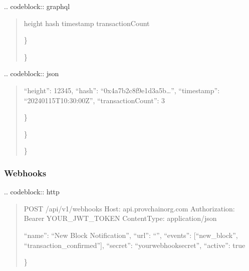 \documentclass[letterpaper,10pt,english]{sphinxmanual}
\begin{document}
\sphinxAtStartPar
{}
.. code\sphinxhyphen{}block:: graphql
\begin{quote}
\begin{description}
\begin{description}
\sphinxAtStartPar
height
hash
timestamp
transactionCount

\end{description}

\sphinxAtStartPar
\}

\end{description}

\sphinxAtStartPar
\}
\end{quote}

\sphinxAtStartPar
{}
.. code\sphinxhyphen{}block:: json
\begin{quote}
\begin{description}
\sphinxlineitem{\{}\begin{description}
\begin{description}
\sphinxAtStartPar
“height”: 12345,
“hash”: “0x4a7b2c8f9e1d3a5b…”,
“timestamp”: “2024\sphinxhyphen{}01\sphinxhyphen{}15T10:30:00Z”,
“transactionCount”: 3

\end{description}

\sphinxAtStartPar
\}

\end{description}

\sphinxAtStartPar
\}

\end{description}

\sphinxAtStartPar
\}
\end{quote}


\subsubsection{Webhooks}
\label{\detokenize{api/index:webhooks}}
\sphinxAtStartPar
{}
.. code\sphinxhyphen{}block:: http
\begin{quote}

\sphinxAtStartPar
POST /api/v1/webhooks
Host: api.provchain\sphinxhyphen{}org.com
Authorization: Bearer YOUR\_JWT\_TOKEN
Content\sphinxhyphen{}Type: application/json
\begin{description}
\sphinxlineitem{\{}
\sphinxAtStartPar
“name”: “New Block Notification”,
“url”: “”,
“events”: {[}“new\_block”, “transaction\_confirmed”{]},
“secret”: “your\sphinxhyphen{}webhook\sphinxhyphen{}secret”,
“active”: true

\end{description}

\sphinxAtStartPar
\}
\end{quote}
\end{document}
